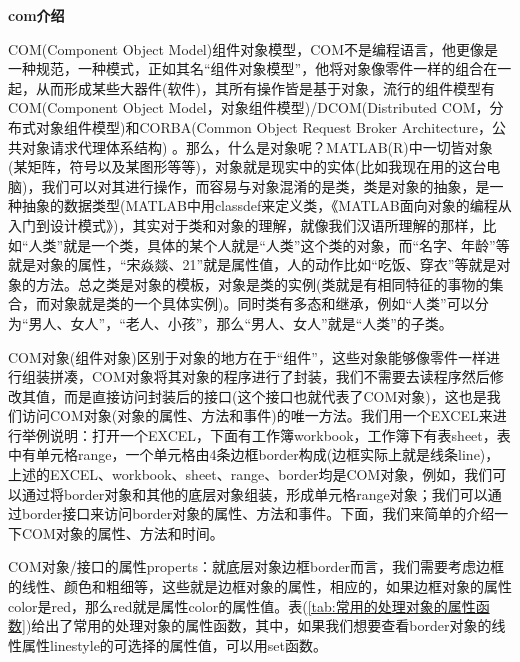             \textbf{com介绍}
            \par
            COM(Component Object Model)组件对象模型，COM不是编程语言，他更像是一种规范，一种模式，正如其名“组件对象模型”，他将对象像零件一样的组合在一起，从而形成某些大器件(软件)，其所有操作皆是基于对象，流行的组件模型有COM(Component Object Model，对象组件模型)/DCOM(Distributed COM，分布式对象组件模型)和CORBA(Common Object Request Broker Architecture，公共对象请求代理体系结构) 。那么，什么是对象呢？MATLAB(R)中一切皆对象(某矩阵，符号以及某图形等等)，对象就是现实中的实体(比如我现在用的这台电脑)，我们可以对其进行操作，而容易与对象混淆的是类，类是对象的抽象，是一种抽象的数据类型(MATLAB中用classdef来定义类，《MATLAB面向对象的编程从入门到设计模式》)，其实对于类和对象的理解，就像我们汉语所理解的那样，比如“人类”就是一个类，具体的某个人就是“人类”这个类的对象，而“名字、年龄”等就是对象的属性，“宋焱燚、21”就是属性值，人的动作比如“吃饭、穿衣”等就是对象的方法。总之类是对象的模板，对象是类的实例(类就是有相同特征的事物的集合，而对象就是类的一个具体实例)。同时类有多态和继承，例如“人类”可以分为“男人、女人”，“老人、小孩”，那么“男人、女人”就是“人类”的子类。
            \par
            COM对象(组件对象)区别于对象的地方在于“组件”，这些对象能够像零件一样进行组装拼凑，COM对象将其对象的程序进行了封装，我们不需要去读程序然后修改其值，而是直接访问封装后的接口(这个接口也就代表了COM对象)，这也是我们访问COM对象(对象的属性、方法和事件)的唯一方法。我们用一个EXCEL来进行举例说明：打开一个EXCEL，下面有工作簿workbook，工作簿下有表sheet，表中有单元格range，一个单元格由4条边框border构成(边框实际上就是线条line)，上述的EXCEL、workbook、sheet、range、border均是COM对象，例如，我们可以通过将border对象和其他的底层对象组装，形成单元格range对象；我们可以通过border接口来访问border对象的属性、方法和事件。下面，我们来简单的介绍一下COM对象的属性、方法和时间。
            \par
            COM对象/接口的属性properts：就底层对象边框border而言，我们需要考虑边框的线性、颜色和粗细等，这些就是边框对象的属性，相应的，如果边框对象的属性color是red，那么red就是属性color的属性值。表(\ref{tab:常用的处理对象的属性函数})给出了常用的处理对象的属性函数，其中，如果我们想要查看border对象的线性属性linestyle的可选择的属性值，可以用set函数。
